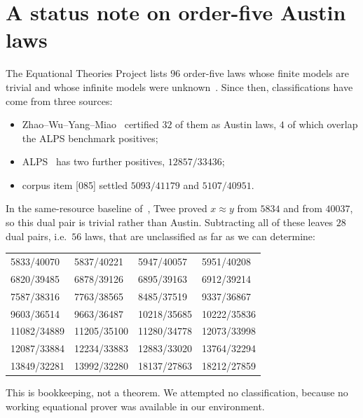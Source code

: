 \documentclass[11pt,a4paper]{article}
\theoremstyle{definition}
\begin{document}
\section{A status note on order-five Austin laws}
The Equational Theories Project lists $96$ order-five laws whose finite models are trivial
and whose infinite models were unknown~\cite{ETPblueprint}. Since then, classifications have
come from three sources:
\begin{itemize}
\item Zhao--Wu--Yang--Miao~\cite{ZWYM} certified $32$ of them as Austin laws, $4$ of which
  overlap the ALPS benchmark positives;
\item ALPS~\cite{ALPS} has two further positives, $12857/33436$;
\item corpus item [085] settled $5093/41179$ and $5107/40951$.
\end{itemize}
In the same-resource baseline of~\cite{ZWYM}, Twee proved $x\approx y$ from $5834$ and
from $40037$, so this dual pair is trivial rather than Austin. Subtracting all of these
leaves $28$ dual pairs, i.e.\ $56$ laws, that are unclassified as far as we can determine:
\begin{center}\small
\begin{tabular}{llll}
5833/40070 & 5837/40221 & 5947/40057 & 5951/40208\\
6820/39485 & 6878/39126 & 6895/39163 & 6912/39214\\
7587/38316 & 7763/38565 & 8485/37519 & 9337/36867\\
9603/36514 & 9663/36487 & 10218/35685 & 10222/35836\\
11082/34889 & 11205/35100 & 11280/34778 & 12073/33998\\
12087/33884 & 12234/33883 & 12883/33020 & 13764/32294\\
13849/32281 & 13992/32280 & 18137/27863 & 18212/27859\\
\end{tabular}
\end{center}
This is bookkeeping, not a theorem. We attempted no classification, because no working
equational prover was available in our environment.

\end{document}
